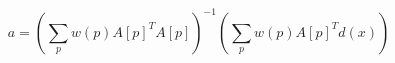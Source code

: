\small
\begin{equation}
    \label{eq:optimal-parameter-affine-weighted}
    a = \left (\sum_p w(p) A[p]^T A[p] \right )^{-1} \left (\sum_p w(p) A[p]^T d(x) \right)
\end{equation}
